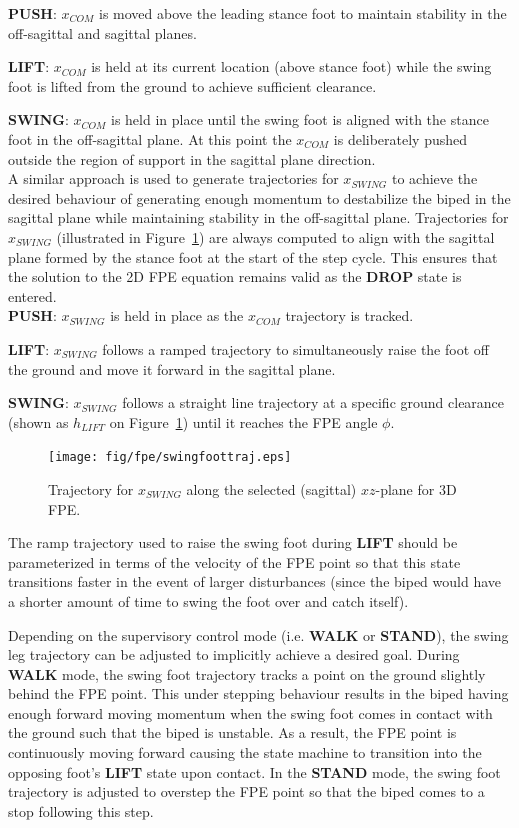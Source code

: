 \textbf{PUSH}: $x_{COM}$ is moved above the leading stance foot to maintain stability in the off-sagittal and sagittal planes.

\textbf{LIFT}: $x_{COM}$ is held at its current location (above stance foot) while the swing foot is lifted from the ground to achieve sufficient clearance.

\textbf{SWING}: $x_{COM}$ is held in place until the swing foot is aligned with the stance foot in the off-sagittal plane. At this point the $x_{COM}$ is deliberately pushed outside the region of support in the sagittal plane direction. \\

A similar approach is used to generate trajectories for $x_{SWING}$ to achieve the desired behaviour of generating enough momentum to destabilize the biped in the sagittal plane while maintaining stability in the off-sagittal plane. Trajectories for $x_{SWING}$ (illustrated in Figure~\ref{fig:swingfoottraj}) are always computed to align with the sagittal plane formed by the stance foot at the start of the step cycle. This ensures that the solution to the 2D FPE equation remains valid as the \textbf{DROP} state is entered. \\

\textbf{PUSH}: $x_{SWING}$ is held in place as the $x_{COM}$ trajectory is tracked.

\textbf{LIFT}: $x_{SWING}$ follows a ramped trajectory to simultaneously raise the foot off the ground and move it forward in the sagittal plane.

\textbf{SWING}: $x_{SWING}$ follows a straight line trajectory at a specific ground clearance (shown as $h_{LIFT}$ on Figure~\ref{fig:swingfoottraj}) until it reaches the FPE angle $\phi$. \\

\begin{figure}[!h]
	\centering
    \texttt{[image: fig/fpe/swingfoottraj.eps]} 
  	\caption{Trajectory for $x_{SWING}$ along the selected (sagittal) $xz$-plane for 3D FPE. \Incomplete}
	\label{fig:swingfoottraj}
\end{figure}

The ramp trajectory used to raise the swing foot during \textbf{LIFT} should be parameterized in terms of the velocity of the FPE point so that this state transitions faster in the event of larger disturbances (since the biped would have a shorter amount of time to swing the foot over and catch itself).

Depending on the supervisory control mode (i.e. \textbf{WALK} or \textbf{STAND}), the swing leg trajectory can be adjusted to implicitly achieve a desired goal. During \textbf{WALK} mode, the swing foot trajectory tracks a point on the ground slightly behind the FPE point. This under stepping behaviour results in the biped having enough forward moving momentum when the swing foot comes in contact with the ground such that the biped is unstable. As a result, the FPE point is continuously moving forward causing the state machine to transition into the opposing foot's \textbf{LIFT} state upon contact. In the \textbf{STAND} mode, the swing foot trajectory is adjusted to overstep the FPE point so that the biped comes to a stop following this step.

